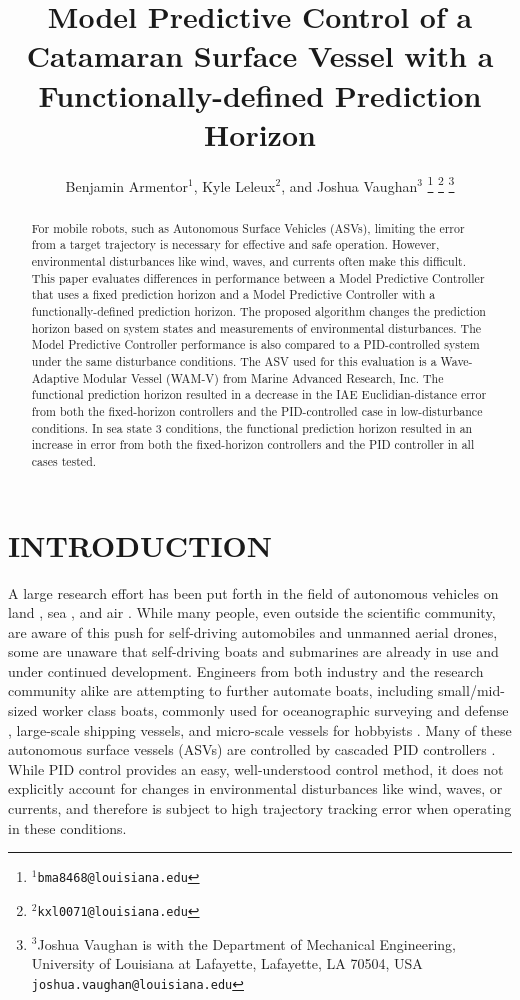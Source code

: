 \documentclass[letterpaper, 10 pt, conference]{ieeeconf}  %
\title{\LARGE \bf
Model Predictive Control of a Catamaran Surface Vessel with a Functionally-defined Prediction Horizon
}
\author{Benjamin Armentor$^{1}$, Kyle Leleux$^{2}$, and Joshua Vaughan$^{3}$%
\thanks{$^{1}${\tt\small bma8468@louisiana.edu}}%
\thanks{$^{2}${\tt\small kxl0071@louisiana.edu}}%
\thanks{$^{3}$Joshua Vaughan is with the Department of Mechanical Engineering,
        University of Louisiana at Lafayette, Lafayette, LA 70504, USA
        {\tt\small joshua.vaughan@louisiana.edu}}%
}
\begin{document}
\maketitle
\thispagestyle{empty}

\begin{abstract}
For mobile robots, such as Autonomous Surface Vehicles (ASVs), limiting the error from a target trajectory is necessary for effective and safe operation. However, environmental disturbances like wind, waves, and currents often make this difficult. This paper evaluates differences in performance between a Model Predictive Controller that uses a fixed prediction horizon and a Model Predictive Controller with a functionally-defined prediction horizon. The proposed algorithm changes the prediction horizon based on system states and measurements of environmental disturbances. The Model Predictive Controller performance is also compared to a PID-controlled system under the same disturbance conditions. The ASV used for this evaluation is a Wave-Adaptive Modular Vessel (WAM-V) from Marine Advanced Research, Inc. The functional prediction horizon resulted in a decrease in the IAE Euclidian-distance error from both the fixed-horizon controllers and the PID-controlled case in low-disturbance conditions. In sea state 3 conditions, the functional prediction horizon resulted in an increase in error from both the fixed-horizon controllers and the PID controller in all cases tested.
\end{abstract}

\section{INTRODUCTION}
A large research effort has been put forth in the field of autonomous vehicles on land \cite{Marquardt:14a, Guo:18a, Falcone:07a}, sea \cite{Fisher:10a, Miao:2018a, Kjerstad:10a}, and air \cite{Gupte:12a, Shim:05a, Bellingham:02a, Mahe:18a}. While many people, even outside the scientific community, are aware of this push for self-driving automobiles and unmanned aerial drones, some are unaware that self-driving boats and submarines are already in use and under continued development. Engineers from both industry and the research community alike are attempting to further automate boats, including small/mid-sized worker class boats, commonly used for oceanographic surveying and defense \cite{Fisher:10a}, large-scale shipping vessels, and micro-scale vessels for hobbyists \cite{Miao:2018a}. Many of these autonomous surface vessels (ASVs) are controlled by cascaded PID controllers \cite{Fisher:10a, Kjerstad:10a, Klinger:17a, Sarda:16a}. While PID control provides an easy, well-understood control method, it does not explicitly account for changes in environmental disturbances like wind, waves, or currents, and therefore is subject to high trajectory tracking error when operating in these conditions.
\end{document}
